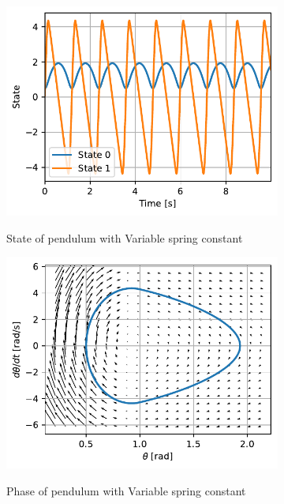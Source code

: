 \documentclass{cmc}
\begin{document}
\begin{figure}[H]
  \centering
  \begin{subfigure}[b]{0.49\textwidth}
    { \centering
      \includegraphics[width=\textwidth]{figures/State_Variable_Spring_Constant_1(x0_=_[0dot5,_0dot1]).pdf}
    }
    \caption{State of pendulum with Variable spring constant}
    \label{fig:state-pendulum-variable-spring-constant-1}
  \end{subfigure}
  \begin{subfigure}[b]{0.49\textwidth}
    { \centering
      \includegraphics[width=\textwidth]{figures/Phase_Variable_Spring_Constant_1(x0_=_[0dot5,_0dot1]).pdf}
    }
    \caption{Phase of pendulum with Variable spring constant}
    \label{fig:phase-pendulum-variable-spring-constant-1}
  \end{subfigure}
  \caption{}
  \label{fig:pendulum-variable-spring-constant-1}
\end{figure}
\end{document}
